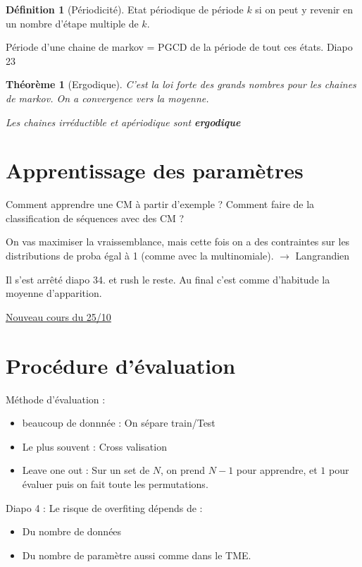 \documentclass{article}
\theoremstyle{plain}%
\newtheorem{thm}{Théorème}[section]
\theoremstyle{definition}
\newtheorem{defn}{Définition}[section]
\theoremstyle{remark}
\begin{document}
\begin{defn}[Périodicité]
    Etat périodique de période $ k $ si on peut y revenir en un nombre d'étape multiple de $ k $.

    Période d'une chaine de markov = PGCD de la période de tout ces états. Diapo 23
\end{defn}

\begin{thm}[Ergodique]
    C'est la loi forte des grands nombres pour les chaines de markov. On a convergence vers la moyenne.

    Les chaines irréductible et apériodique sont \textbf{ergodique}
\end{thm}

\section{Apprentissage des paramètres}
Comment apprendre une CM à partir d'exemple ? Comment faire de la classification de séquences avec des CM ? 

On vas maximiser la vraissemblance, mais cette fois on a des contraintes sur les distributions de proba égal à 1 (comme avec la multinomiale). $\rightarrow$ Langrandien 

Il s'est arrêté diapo 34. et rush le reste. Au final c'est comme d'habitude la moyenne d'apparition.

\underline{Nouveau cours du 25/10} \\

\section{Procédure d'évaluation}
Méthode d'évaluation : 
\begin{itemize}
    \item beaucoup de donnnée : On sépare train/Test
    \item Le plus souvent : Cross valisation 
    \item Leave one out : Sur un set de $ N $, on prend $ N-1 $ pour apprendre, et $ 1 $ pour évaluer puis on fait toute les permutations.
\end{itemize}

Diapo 4 : Le risque de overfiting dépends de :
\begin{itemize}
    \item Du nombre de données
    \item Du nombre de paramètre aussi comme dans le TME.
\end{itemize}
\end{document}
